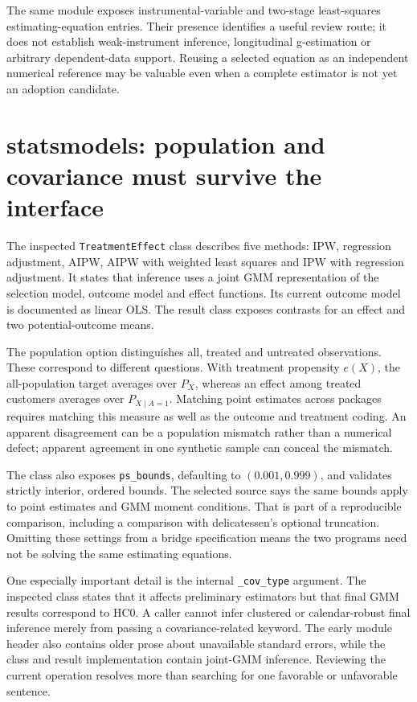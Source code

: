 The same module exposes instrumental-variable and two-stage least-squares
estimating-equation entries. Their presence identifies a useful review route;
it does not establish weak-instrument inference, longitudinal g-estimation or
arbitrary dependent-data support. Reusing a selected equation as an independent
numerical reference may be valuable even when a complete estimator is not yet
an adoption candidate.\cite{v13_sw_delicatessen}

\section{statsmodels: population and covariance must survive the interface}

The inspected \texttt{TreatmentEffect} class describes five methods: IPW,
regression adjustment, AIPW, AIPW with weighted least squares and IPW with
regression adjustment. It states that inference uses a joint GMM representation
of the selection model, outcome model and effect functions. Its current outcome
model is documented as linear OLS. The result class exposes contrasts for an
effect and two potential-outcome means.\cite{v13_sw_statsmodels}

The population option distinguishes all, treated and untreated observations.
These correspond to different questions. With treatment propensity $e(X)$,
the all-population target averages over $P_X$, whereas an effect among treated
customers averages over $P_{X\mid A=1}$. Matching point estimates across packages
requires matching this measure as well as the outcome and treatment coding.
An apparent disagreement can be a population mismatch rather than a numerical
defect; apparent agreement in one synthetic sample can conceal the mismatch.

The class also exposes \texttt{ps\_bounds}, defaulting to $(0.001,0.999)$, and
validates strictly interior, ordered bounds. The selected source says the same
bounds apply to point estimates and GMM moment conditions. That is part of a
reproducible comparison, including a comparison with delicatessen's optional
truncation. Omitting these settings from a bridge specification means the two
programs need not be solving the same estimating equations.

One especially important detail is the internal \texttt{\_cov\_type} argument.
The inspected class states that it affects preliminary estimators but that final
GMM results correspond to HC0. A caller cannot infer clustered or calendar-robust
final inference merely from passing a covariance-related keyword. The early
module header also contains older prose about unavailable standard errors,
while the class and result implementation contain joint-GMM inference. Reviewing
the current operation resolves more than searching for one favorable or
unfavorable sentence.\cite{v13_sw_statsmodels}

